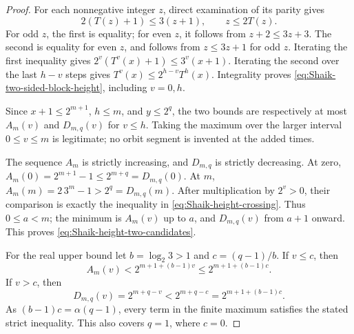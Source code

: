 \begin{proof}
For each nonnegative integer \(z\), direct examination of its parity gives
\[
 2(T(z)+1)\le3(z+1),\qquad z\le2T(z).
\]
For odd \(z\), the first is equality; for even \(z\), it follows from
\(z+2\le3z+3\). The second is equality for even \(z\), and follows from
\(z\le3z+1\) for odd \(z\). Iterating the first inequality gives
\(2^v(T^v(x)+1)\le3^v(x+1)\). Iterating the second over the last
\(h-v\) steps gives \(T^v(x)\le2^{h-v}T^h(x)\). Integrality proves
\eqref{eq:Shaik-two-sided-block-height}, including \(v=0,h\).

Since \(x+1\le2^{m+1}\), \(h\le m\), and \(y\le2^q\), the two bounds
are respectively at most \(A_m(v)\) and \(D_{m,q}(v)\) for \(v\le h\).
Taking the maximum over the larger interval \(0\le v\le m\) is legitimate;
no orbit segment is invented at the added times.

The sequence \(A_m\) is strictly increasing, and \(D_{m,q}\) is strictly
decreasing. At zero, \(A_m(0)=2^{m+1}-1\le2^{m+q}=D_{m,q}(0)\).
At \(m\), \(A_m(m)=2\,3^m-1>2^q=D_{m,q}(m)\).
After multiplication by \(2^v>0\), their comparison is exactly the
inequality in \eqref{eq:Shaik-height-crossing}. Thus \(0\le a<m\);
the minimum is \(A_m(v)\) up to \(a\), and \(D_{m,q}(v)\) from \(a+1\)
onward. This proves \eqref{eq:Shaik-height-two-candidates}.

For the real upper bound let \(b=\log_2 3>1\) and \(c=(q-1)/b\).
If \(v\le c\), then
\[
 A_m(v)<2^{m+1+(b-1)v}\le2^{m+1+(b-1)c}.
\]
If \(v>c\), then
\[
 D_{m,q}(v)=2^{m+q-v}<2^{m+q-c}
                    =2^{m+1+(b-1)c}.
\]
As \((b-1)c=\alpha(q-1)\), every term in the finite maximum satisfies
the stated strict inequality. This also covers \(q=1\), where \(c=0\).
\end{proof}

